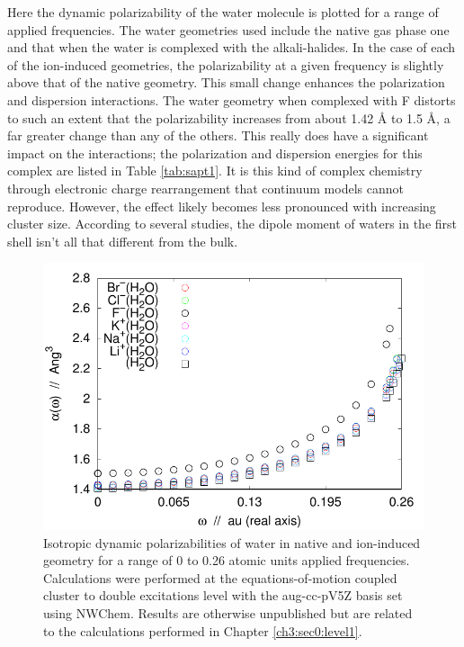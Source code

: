 \begin{intro}
    Here the dynamic polarizability of the water molecule is plotted for a range of applied frequencies. The water geometries used include the native gas phase one and that when
    the water is complexed with the alkali-halides. In the case of each of the ion-induced geometries, the polarizability at a given frequency is slightly above that of the
    native geometry. This small change enhances the polarization and dispersion interactions. The water geometry when complexed with F\sur{-} distorts to such an extent that
    the polarizability increases from about 1.42 \AA{} to 1.5 \AA{}, a far greater change than any of the others. This really does have a significant impact on the
    interactions; the polarization and dispersion energies for this complex are listed in Table \ref{tab:sapt1}. It is this kind of complex chemistry through electronic
    charge rearrangement that continuum models cannot reproduce. However, the effect likely becomes less pronounced with increasing cluster size. According to several studies, 
    the dipole moment of waters in the first shell isn't all that different from the bulk\cite{heuft2003cl,heuft2005f,heuft2005i,krekeler2006density,lightstone2001first}.
    
\begin{figure}
 \begin{center}
  \includegraphics[width=0.98\linewidth]{images/all_polar_data.pdf}
 \end{center}
\caption[Dynamic polarizabilities of water in gas phase and ion-water dimer geometries]{Isotropic dynamic polarizabilities of water in native and ion-induced geometry for a 
range of 0 to 0.26 atomic units applied frequencies. Calculations were performed at the equations-of-motion coupled cluster to double excitations level with the aug-cc-pV5Z 
basis set using NWChem\cite{valiev2010nwchem}. Results are otherwise unpublished but are related to the calculations performed in Chapter \ref{ch3:sec0:level1}.}
\label{fig:dypol}
\end{figure}
    

\end{intro}

